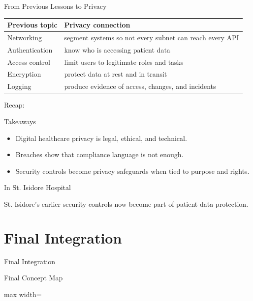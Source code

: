 \documentclass[presentation]{beamer}
\newcommand{\sectiontitleframe}[1]{
\begin{frame}[plain,c]
\begin{center}
{\usebeamerfont{title}\usebeamercolor[fg]{title}#1}
\end{center}
\end{frame}
}
\newcommand{\scenario}{St. Isidore Hospital}
\newcommand{\takeawaysframe}[2]{
\begin{frame}[c]{Recap: \insertsection}
\begin{block}{Takeaways}
#1
\end{block}
\begin{exampleblock}{In \scenario}
#2
\end{exampleblock}
\end{frame}
}
\begin{document}
\begin{frame}[c]{From Previous Lessons to Privacy}
\small
\begin{tabularx}{\textwidth}{@{}p{}X@{}}
\toprule
\textbf{Previous topic} & \textbf{Privacy connection} \\
\midrule
Networking & segment systems so not every subnet can reach every API \\
Authentication & know who is accessing patient data \\
Access control & limit users to legitimate roles and tasks \\
Encryption & protect data at rest and in transit \\
Logging & produce evidence of access, changes, and incidents \\
\bottomrule
\end{tabularx}
\end{frame}

\takeawaysframe{
\begin{itemize}
    \item Digital healthcare privacy is legal, ethical, and technical.
    \item Breaches show that compliance language is not enough.
    \item Security controls become privacy safeguards when tied to purpose and rights.
\end{itemize}
}{
St. Isidore's earlier security controls now become part of patient-data protection.
}

\section{Final Integration}
\sectiontitleframe{Final Integration}

\begin{frame}[c]{Final Concept Map}
\begin{center}
\begin{adjustbox}{max width=\textwidth}
\end{adjustbox}
\end{center}
\end{frame}
\end{document}
